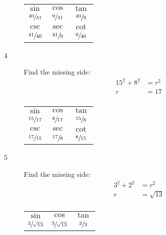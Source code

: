\documentclass{exam}
\begin{document}
\begin{description}
\begin{tabular}[H]{ccc}
          $\sin$           & $\cos$          & $\tan$          \\
          $\sfrac{40}{41}$ & $\sfrac{9}{41}$ & $\sfrac{40}{9}$ \\

          \midrule

          $\csc$           & $\sec$          & $\cot$ \\
          $\sfrac{41}{40}$ & $\sfrac{41}{9}$ & $\sfrac{9}{40}$ \\

          \bottomrule
        \end{tabular}

      \item[4] 
        Find the missing side:
        \begin{align*}
          15^2 + 8^2 & = r^2 \\
          r          & = 17 \\
        \end{align*}

        \begin{tabular}[H]{ccc}
          \toprule

          $\sin$           & $\cos$          & $\tan$          \\
          $\sfrac{15}{17}$ & $\sfrac{8}{17}$ & $\sfrac{15}{8}$ \\

          \midrule

          $\csc$           & $\sec$          & $\cot$ \\
          $\sfrac{17}{15}$ & $\sfrac{17}{8}$ & $\sfrac{8}{15}$ \\

          \bottomrule
        \end{tabular}

      \item[5] 
        Find the missing side:
        \begin{align*}
          3^2 + 2^2 & = r^2 \\
          r         & = \sqrt{13} \\
        \end{align*}

        \begin{tabular}[H]{ccc}
          \toprule
          $\sin$                 & $\cos$                 & $\tan$         \\
          $\sfrac{2}{\sqrt{13}}$ & $\sfrac{3}{\sqrt{13}}$ & $\sfrac{2}{3}$ \\


\end{tabular}
\end{description}
\end{document}
